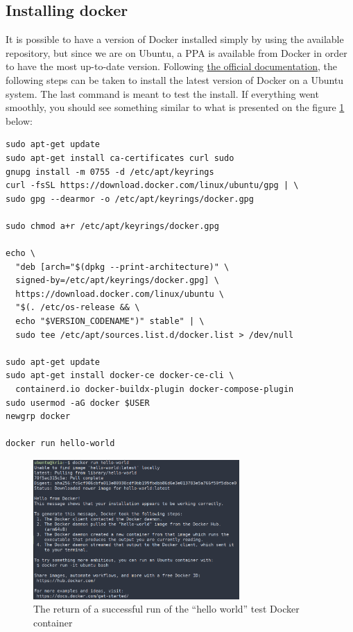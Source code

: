 \documentclass[10pt]{article}
\begin{document}
\subsection{Installing docker}
It is possible to have a version of Docker installed simply by using the available repository, but since we are on Ubuntu, a PPA is available
from Docker in order to have the most up-to-date version.
Following \href{https://docs.docker.com/engine/install/ubuntu/#install-using-the-repository}{the official documentation}, the following steps can be taken to
install the latest version of Docker on a Ubuntu system.
The last command is meant to test the install. If everything went smoothly, you should see something similar to what is presented on the figure \ref{fig:hello-docker} below:
\begin{tcolorbox}
\begin{verbatim}
sudo apt-get update
sudo apt-get install ca-certificates curl sudo
gnupg install -m 0755 -d /etc/apt/keyrings
curl -fsSL https://download.docker.com/linux/ubuntu/gpg | \
sudo gpg --dearmor -o /etc/apt/keyrings/docker.gpg

sudo chmod a+r /etc/apt/keyrings/docker.gpg

echo \
  "deb [arch="$(dpkg --print-architecture)" \
  signed-by=/etc/apt/keyrings/docker.gpg] \
  https://download.docker.com/linux/ubuntu \
  "$(. /etc/os-release && \
  echo "$VERSION_CODENAME")" stable" | \
  sudo tee /etc/apt/sources.list.d/docker.list > /dev/null

sudo apt-get update
sudo apt-get install docker-ce docker-ce-cli \
  containerd.io docker-buildx-plugin docker-compose-plugin
sudo usermod -aG docker $USER
newgrp docker

docker run hello-world
\end{verbatim}
\end{tcolorbox}

\begin{figure}[H]
  \centering
  \includegraphics[width=0.7\textwidth]{./img/hello-docker.png}
  \caption{The return of a successful run of the ``hello world'' test Docker container}
  \label{fig:hello-docker}
\end{figure}
\end{document}
